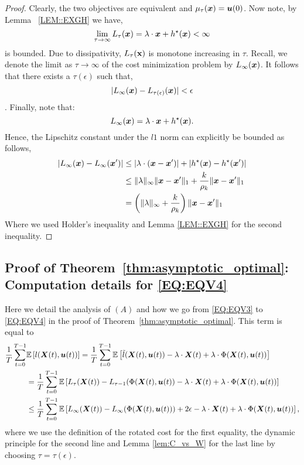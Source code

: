 \begin{proof}
Clearly, the two objectives are equivalent and $\mu_{\tau}({\bm{x}}) = \bm{u}(0)$. Now note, by Lemma ~\ref{LEM::EXGH} we have, $$\lim_{\tau \to \infty}L_{\tau}({\bm{x}}) = \lambda \cdot {\bm{x}} + h^{\star}({\bm{x}}) < \infty$$ is bounded. Due to dissipativity, $L_{\tau}(\textbf{x})$ is monotone increasing in $\tau$. %
Recall, we denote the limit as $\tau \to \infty$ of the cost minimization problem by $L_{\infty}({\bm{x}})$. It follows that there exists a $\tau(\epsilon)$ such that,
\[
|L_{\infty}({\bm{x}}) - L_{\tau(\epsilon)}({\bm{x}})| < \epsilon
\].
Finally, note that: 
$$L_{\infty}({\bm{x}}) = \lambda \cdot {\bm{x}} + h^{\star}({\bm{x}}). $$
Hence, the Lipschitz constant under the $l1$ norm can explicitly be bounded as follows,
\begin{align*}
    |L_{\infty}({\bm{x}}) - L_{\infty}({\bm{x}}')| &\leq |\lambda \cdot ({\bm{x}} - {\bm{x}}')| + |h^{\star}({\bm{x}}) - h^{\star}({\bm{x}}')|\\
    &\leq \|\lambda\|_{\infty}\|{\bm{x}} - {\bm{x}}'\|_1 + \frac{k}{\rho_k}\|{\bm{x}} - {\bm{x}}'\|_1\\
    &= \left(\|\lambda\|_{\infty} + \frac{k}{\rho_k}\right)\|{\bm{x}} - {\bm{x}}'\|_1
\end{align*}
Where we used Holder's inequality and Lemma \ref{LEM::EXGH} for the second inequality.  
\end{proof}

\subsection{Proof of Theorem~\ref{thm:asymptotic_optimal}: Computation details for \eqref{EQ:EQV4}}
\label{apx:proof_thm1_details}

Here we detail the analysis of $(A)$ and how we go from \eqref{EQ:EQV3} to \eqref{EQ:EQV4} in the proof of Theorem~\ref{thm:asymptotic_optimal}.  This term is equal to 
\begin{align}
    \frac1T\sum_{t = 0}^{T-1} &\mathbb{E} \left[l({\bm{X}(t)}, \bm{u}(t))\right] = \frac1T\sum_{t = 0}^{T-1} \mathbb{E} \left[\Tilde{l}({\bm{X}}(t), \bm{u}(t)) - \lambda\cdot{\bm{X}}(t) + \lambda\cdot\Phi({\bm{X}}(t), \bm{u}(t)) \right] \nonumber\\
    &= \frac1T\sum_{t = 0}^{T-1} \mathbb{E} \left[ L_\tau({\bm{X}(t)}) - L_{\tau-1}(\Phi({\bm{X}(t)},\bm{u}(t)) - \lambda\cdot{\bm{X}}(t) + \lambda\cdot\Phi({\bm{X}}(t), \bm{u}(t))  \right]\nonumber\\
    &\le \frac1T\sum_{t = 0}^{T-1} \mathbb{E} \left[ L_\infty({\bm{X}(t)}) - L_{\infty}(\Phi({\bm{X}(t)},\bm{u}(t))) + 2\epsilon - \lambda\cdot{\bm{X}}(t) + \lambda\cdot\Phi({\bm{X}}(t), \bm{u}(t))  \right],
    \label{EQ:APX_(A)}
\end{align}
where we use the definition of the rotated cost for the first equality, the dynamic principle for the second line and Lemma \ref{lem:C_vs_W} for the last line by choosing $\tau = \tau(\epsilon)$.

